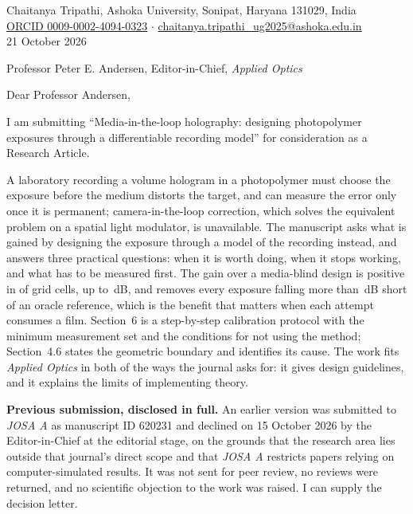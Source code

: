 \documentclass[10pt]{article}
\begin{document}
\begin{flushright}
Chaitanya Tripathi, Ashoka University, Sonipat, Haryana 131029, India\\
\href{https://orcid.org/0009-0002-4094-0323}{ORCID 0009-0002-4094-0323} $\cdot$
\href{mailto:chaitanya.tripathi_ug2025@ashoka.edu.in}{chaitanya.tripathi\_ug2025@ashoka.edu.in}\\
21 October 2026
\end{flushright}

Professor Peter E. Andersen, Editor-in-Chief, \textit{Applied Optics}

Dear Professor Andersen,

I am submitting ``Media-in-the-loop holography: designing photopolymer
exposures through a differentiable recording model'' for consideration as a
Research Article.

A laboratory recording a volume hologram in a photopolymer must choose the
exposure before the medium distorts the target, and can measure the error only
once it is permanent; camera-in-the-loop correction, which solves the
equivalent problem on a spatial light modulator, is unavailable. The manuscript
asks what is gained by designing the exposure through a model of the recording
instead, and answers three practical questions: when it is worth doing, when it
stops working, and what has to be measured first. The gain over a media-blind
design is positive in \MOneNPositive{} of \MOneNCells{} grid cells, up to
\MaxGainEightX\,dB, and removes every exposure falling more than
\WastedMediaThreshDB\,dB short of an oracle reference, which is the benefit
that matters when each attempt consumes a film. Section~6 is a step-by-step
calibration protocol with the minimum measurement set and the conditions for
not using the method; Section~4.6 states the geometric boundary and identifies
its cause. The work fits \textit{Applied Optics} in both of the ways the
journal asks for: it gives design guidelines, and it explains the limits of
implementing theory.

\textbf{Previous submission, disclosed in full.} An earlier version was
submitted to \textit{JOSA A} as manuscript ID 620231 and declined on 15 October
2026 by the Editor-in-Chief at the editorial stage, on the grounds that the
research area lies outside that journal's direct scope and that \textit{JOSA A}
restricts papers relying on computer-simulated results. It was not sent for
peer review, no reviews were returned, and no scientific objection to the work
was raised. I can supply the decision letter.
\end{document}
